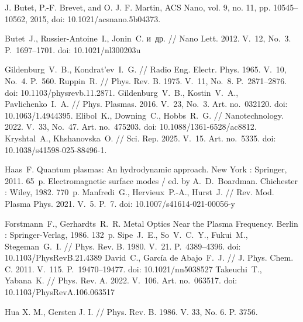 \documentclass[12pt, a4paper]{article}
\begin{document}
\begin{thebibliography}{99}
J. Butet, P.-F. Brevet, and O. J. F. Martin, {ACS Nano}, vol. 9, no. 11, pp. 10545–10562, 2015, doi: 10.1021/acsnano.5b04373.

Butet~J., Russier-Antoine~I., Jonin~C. и~др. // Nano Lett. 2012. V.~12, No.~3. P.~1697--1701. doi: 10.1021/nl300203u

Gildenburg~V.~B., Kondrat’ev~I.~G. // Radio Eng. Electr. Phys. 1965. V.~10, No.~4. P.~560.
Ruppin~R. // Phys. Rev. B. 1975. V.~11, No.~8. P.~2871--2876. doi: 10.1103/physrevb.11.2871.
Gildenburg~V.~B., Kostin~V.~A., Pavlichenko~I.~A. // Phys. Plasmas. 2016. V.~23, No.~3. Art. no.~032120. doi: 10.1063/1.4944395.
Elibol~K., Downing~C., Hobbs~R.~G. // Nanotechnology. 2022. V.~33, No.~47. Art. no.~475203. doi: 10.1088/1361-6528/ac8812.
Kryshtal~A., Khshanovska~O. // Sci. Rep. 2025. V.~15. Art. no.~5335. doi: 10.1038/s41598-025-88496-1.

Haas~F. Quantum plasmas: An hydrodynamic approach. New York : Springer, 2011. 65~p.
Electromagnetic surface modes / ed. by A.~D.~Boardman. Chichester : Wiley, 1982. 770~p.
Manfredi~G., Hervieux~P.-A., Hurst~J. // Rev. Mod. Plasma Phys. 2021. V.~5. P.~7. 
doi: 10.1007/s41614-021-00056-y


Forstmann~F., Gerhardts~R.~R. Metal Optics Near the Plasma Frequency. Berlin : Springer-Verlag, 1986. 132~p.
Sipe~J.~E., So~V.~C.~Y., Fukui~M., Stegeman~G.~I. // Phys. Rev. B. 1980. V.~21. P.~4389--4396. doi: 10.1103/PhysRevB.21.4389
David~C., Garc\'{i}a de Abajo~F.~J. // J. Phys. Chem. C. 2011. V.~115. P.~19470--19477. doi: 10.1021/nn5038527
Takeuchi~T., Yabana~K. // Phys. Rev. A. 2022. V.~106. Art. no.~063517. doi: 10.1103/PhysRevA.106.063517

Hua X. M., Gersten J. I. // Phys. Rev. B. 1986. V. 33, No. 6. P. 3756.



\end{thebibliography}

\newpage
\end{document}
